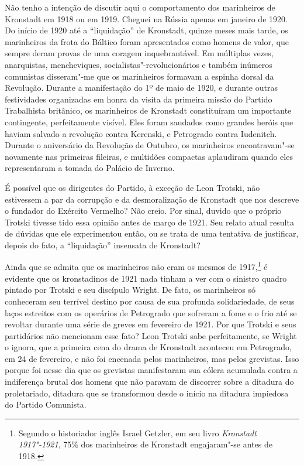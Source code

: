 Não tenho a intenção de discutir aqui o comportamento dos marinheiros de
Kronstadt em 1918 ou em 1919. Cheguei na Rússia apenas em janeiro de
1920. Do início de 1920 até a “liquidação” de Kronstadt, quinze meses
mais tarde, os marinheiros da frota do Báltico foram apresentados como
homens de valor, que sempre deram provas de uma coragem inquebrantável.
Em múltiplas vezes, anarquistas, mencheviques,
socialistas"-revolucionários e também inúmeros comunistas
disseram"-me que os marinheiros formavam a espinha dorsal da
Revolução. Durante a manifestação do 1º de maio de 1920, e durante
outras festividades organizadas em honra da visita da primeira missão
do Partido Trabalhista britânico, os marinheiros de Kronstadt
constituíram um importante contingente, perfeitamente visível. Eles
foram saudados como grandes heróis que haviam salvado a revolução
contra Kerenski, e Petrogrado contra Iudenitch. Durante o aniversário
da Revolução de Outubro, os marinheiros encontravam"-se novamente nas
primeiras fileiras, e multidões compactas aplaudiram quando eles
representaram a tomada do Palácio de Inverno.

É possível que os dirigentes do Partido, à exceção de Leon Trotski, não
estivessem a par da corrupção e da desmoralização de Kronstadt que nos
descreve o fundador do Exército Vermelho? Não creio. Por sinal, duvido
que o próprio Trotski tivesse tido essa opinião antes de março de 1921.
Seu relato atual resulta de dúvidas que ele experimentou então, ou se
trata de uma tentativa de justificar, depois do fato, a “liquidação”
insensata de Kronstadt?

Ainda que se admita que os marinheiros não eram os mesmos de 1917,\footnote{ 
Segundo o historiador inglês Israel Getzler, em seu livro \textit{Kronstadt
1917"-1921}, 75\% dos marinheiros de Kronstadt engajaram"-se antes
de 1918.} é
evidente que os kronstadinos de 1921 nada tinham a ver com o sinistro
quadro pintado por Trotski e seu discípulo Wright. De fato, os
marinheiros só conheceram seu terrível destino por causa de sua
profunda solidariedade, de seus laços estreitos com os operários de
Petrogrado que sofreram a fome e o frio até se revoltar durante uma
série de greves em fevereiro de 1921. Por que Trotski e seus
partidários não mencionam esse fato? Leon Trotski sabe perfeitamente,
se Wright o ignora, que a primeira cena do drama de Kronstadt aconteceu
em Petrogrado, em 24 de fevereiro, e não foi encenada pelos marinheiros,
mas pelos grevistas. Isso porque foi nesse dia que os grevistas
manifestaram sua cólera acumulada contra a indiferença brutal dos
homens que não paravam de discorrer sobre a ditadura do proletariado,
ditadura que se transformou desde o início na ditadura impiedosa do
Partido Comunista.

